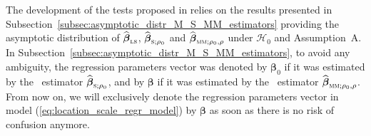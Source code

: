 The development of the tests proposed in \citet{Dehon:2012} relies on the
results presented in Subsection~\ref{subsec:asymptotic_distr_M_S_MM_estimators}
providing the asymptotic distribution of $\sthat{\boldsymbol\beta}_\stsc{LS}$,
$\sthat{\boldsymbol\beta}_{\stsc{S};\rho_0}$ and
$\sthat{\boldsymbol\beta}_{\stsc{MM};\rho_0,\rho}$ under $\mathcal{H}_0$ and
Assumption~A. In Subsection~\ref{subsec:asymptotic_distr_M_S_MM_estimators}, to
avoid any ambiguity, the regression parameters vector was denoted by
$\boldsymbol\beta_0$ if it was estimated by the ~estimator
$\sthat{\boldsymbol\beta}_{\stsc{S};\rho_0}$, and by $\boldsymbol\beta$ if it
was estimated by the ~estimator
$\sthat{\boldsymbol\beta}_{\stsc{MM};\rho_0,\rho}$. From now on, we will
exclusively denote the regression parameters vector in model
(\ref{eq:location_scale_regr_model}) by $\boldsymbol\beta$ as soon as there is
no risk of confusion anymore.

